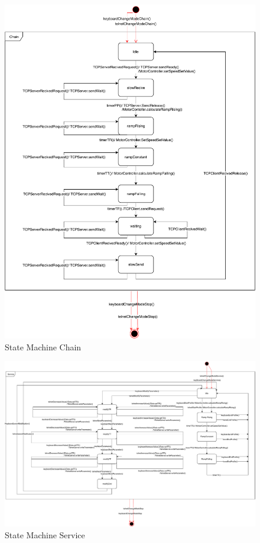 \documentclass[a4paper,12pt,twoside]{scrreprt}
\begin{document}
\begin{figure}[H]
	\centering
	\includegraphics[width=\textwidth,height=\textheight,keepaspectratio]{stateDiagram/StateMachineChain.pdf}
	\caption[State Machine Chain]{State Machine Chain}
	\label{fig:StateMachineChain}
\end{figure}


\begin{figure}[H]
	\centering
	\includegraphics[width=\textwidth,height=\textheight,keepaspectratio]{stateDiagram/StateMachineService.pdf}
	\caption[State Machine Service]{State Machine Service}
	\label{fig:StateMachineService}
\end{figure}
 
\end{document}
